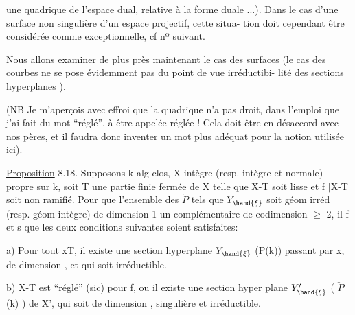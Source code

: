  
une quadrique de l'espace dual, relative à la forme duale ...).   Dans le
cas d'une surface non singulière  d'un espace projectif, cette situa-%
tion doit cependant être considérée comme exceptionnelle, cf nº suivant.

Nous allons examiner de plus près   maintenant le cas des surfaces
(le cas des courbes ne se pose évidemment pas du point de vue irréductibi-%
lité des sections hyperplanes  ).

(NB  Je m'aperçois avec effroi que la quadrique n'a pas droit, dans
l'emploi que j'ai fait du mot ``réglé'', à être appelée réglée !  Cela doit
être en désaccord avec nos pères, et il faudra donc inventer un mot plus
adéquat pour la notion utilisée ici).

\uline{Proposition} 8.18.  Supposons  k alg clos, X 
 intègre (resp. intègre et normale)
propre sur k, soit T une partie finie fermée de X telle que  X-T soit
lisse  et f $|$X-T  soit non ramifié.  Pour que l'ensemble des \hand{$\xi \in$} $\check{P}$  tels
que  $Y_{\hand{\xi}}$  soit  géom irréd   (resp.  géom intègre)  de dimension  1
  un complémentaire de  codimension $\geq$ 2, il f et s que les deux
conditions suivantes soient satisfaites:

a)  Pour tout x\hand{$\in$}T, il existe une section hyperplane $Y_{\hand{\xi}}$   (\hand{$\xi \in$}P(k))
passant par x, de dimension , et qui soit irréductible.

b)  X-T est ``réglé'' (sic)  pour f, \uline{ou}  il existe  une section hyper
plane  $Y'_{\hand{\xi}}$  (\hand{$\xi \in$} $\check{P}$(k) )  de X',   qui soit de dimension ,
singulière et  irréductible.



